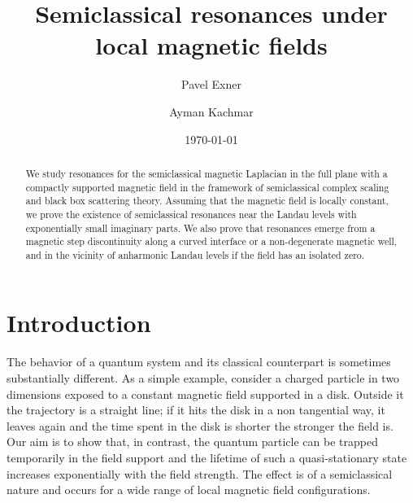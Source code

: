 \documentclass[11pt]{amsart}
\title{Semiclassical resonances under local magnetic fields}
\author{Pavel Exner}
\author{Ayman Kachmar}
\date{\today}
\theoremstyle{remark}
\numberwithin{equation}{section}
\begin{document}
\begin{abstract}
We study resonances for the semiclassical magnetic Laplacian in the full plane with a compactly supported magnetic field in the framework of semiclassical complex scaling and black box scattering theory. Assuming that the magnetic field is locally constant, we prove the existence of semiclassical resonances near the Landau levels with exponentially small imaginary parts. We also prove that resonances emerge from a magnetic step discontinuity along a curved interface or a
non-degenerate magnetic well, and in the vicinity of anharmonic Landau levels if the field has an isolated zero.
%
\end{abstract}

\maketitle


\section{Introduction}

The behavior of a quantum system and its classical counterpart is sometimes substantially different. As a simple example, consider a charged particle in two dimensions exposed to a constant magnetic field supported in a disk. Outside it the trajectory is a straight line; if it hits the disk in a non tangential way, it leaves  again and the time spent in the disk is  shorter the stronger the field is. Our aim is to show that, in contrast, the quantum particle can be trapped temporarily  in the field support and the lifetime of such a quasi-stationary state increases exponentially with the field strength. The effect is of a semiclassical nature and occurs for a wide range of local magnetic field configurations.
\end{document}

